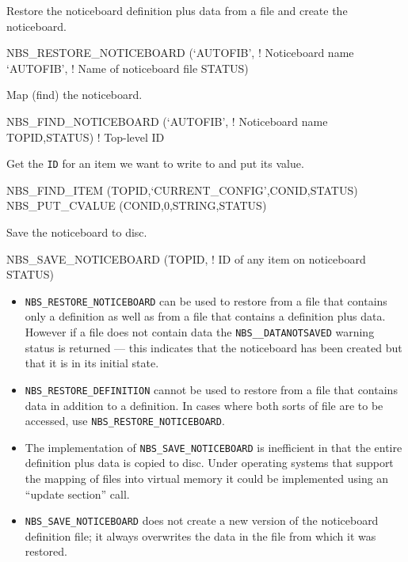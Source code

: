 \documentclass[twoside,11pt,nolof]{starlink}
\begin{document}
Restore the noticeboard definition plus data from a file and create the
noticeboard.

\begin{terminalv}
NBS_RESTORE_NOTICEBOARD (`AUTOFIB',       ! Noticeboard name
                         `AUTOFIB',       ! Name of noticeboard file
                         STATUS)
\end{terminalv}

Map (find) the noticeboard.

\begin{terminalv}
NBS_FIND_NOTICEBOARD (`AUTOFIB',          ! Noticeboard name
                      TOPID,STATUS)       ! Top-level ID
\end{terminalv}

Get the \texttt{ID} for an item we want to write to and put its value.

\begin{terminalv}
NBS_FIND_ITEM (TOPID,`CURRENT_CONFIG',CONID,STATUS)
NBS_PUT_CVALUE (CONID,0,STRING,STATUS)
\end{terminalv}

Save the noticeboard to disc.

\begin{terminalv}
NBS_SAVE_NOTICEBOARD (TOPID,              ! ID of any item on noticeboard
                      STATUS)
\end{terminalv}

\begin {itemize}
\item \texttt{NBS\_RESTORE\_NOTICEBOARD} can be used to restore from a file
that contains only a definition as well as from a file that contains a
definition plus data. However if a file does not contain data the \texttt{NBS\_\_DATANOTSAVED} warning status is returned --- this indicates that the
noticeboard has been created but that it is in its initial state.
\item \texttt{NBS\_RESTORE\_DEFINITION} cannot be used to restore from a file
that contains data in addition to a definition. In cases where both sorts
of file are to be accessed, use \texttt{NBS\_RESTORE\_NOTICEBOARD}.
\item The implementation of \texttt{NBS\_SAVE\_NOTICEBOARD} is inefficient
in that the entire definition plus data is copied to disc. Under operating
systems that support the mapping of files into virtual memory it could be
implemented using an ``update section'' call.
\item \texttt{NBS\_SAVE\_NOTICEBOARD} does not create a new version of the
noticeboard definition file; it always overwrites the data in the file from
which it was restored.
\end {itemize}
\end{document}
